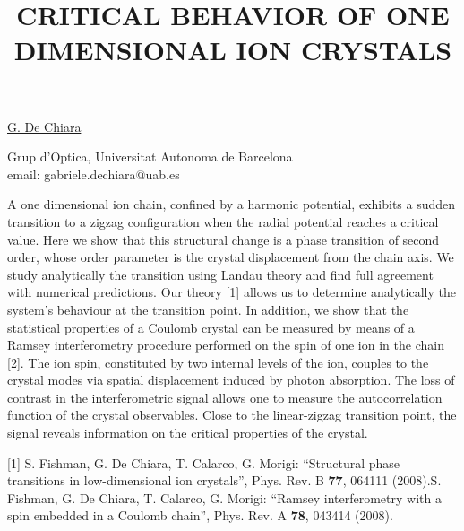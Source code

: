 \title{CRITICAL BEHAVIOR OF ONE DIMENSIONAL ION CRYSTALS}

\underline{G. De Chiara}


Grup d'Optica, Universitat Autonoma de Barcelona\\
email: gabriele.dechiara@uab.es

A one dimensional ion chain, confined by a harmonic potential, exhibits a sudden transition to a zigzag configuration when the
radial potential reaches a critical value. Here we show that this structural change is a phase transition of second order, whose
order parameter is the crystal displacement from the chain axis. We study analytically the transition using Landau theory and find
full agreement with numerical predictions. Our theory [1] allows us to determine analytically the system's behaviour at the
transition point. In addition, we show that the statistical properties of a Coulomb crystal can be measured by means of a Ramsey
interferometry procedure performed on the spin of one ion in the chain [2]. The ion spin, constituted by two internal levels of the
ion, couples to the crystal modes via spatial displacement induced by photon absorption. The loss of contrast in the
interferometric signal allows one to measure the autocorrelation function of the crystal observables. Close to the linear-zigzag
transition point, the signal reveals information on the critical properties of the crystal.

[1] S. Fishman, G. De Chiara, T. Calarco, G. Morigi: ``Structural phase transitions in low-dimensional ion crystals'', Phys. Rev. B
\textbf{77}, 064111 (2008).\newline
[2] S. Fishman, G. De Chiara, T. Calarco, G. Morigi: ``Ramsey interferometry with a spin embedded in a Coulomb chain'', Phys.
Rev. A \textbf{78}, 043414 (2008).\newline

\vspace{\baselineskip}